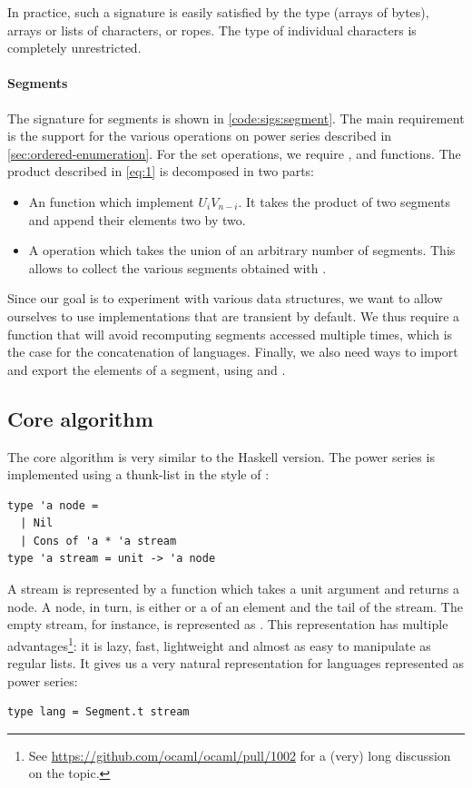 In practice, such a signature is easily satisfied by the \ocaml {}
type (\ie arrays of bytes), arrays or lists of characters, or ropes. The
type of individual characters is completely unrestricted.

\paragraph{Segments}

The signature for segments is shown in \autoref{code:sigs:segment}.
The main requirement is the support for the various operations on power series described in
\autoref{sec:ordered-enumeration}.
For the set operations, we require
,  and  functions.
%
The product described in \autoref{eq:1} is decomposed in two parts:
\begin{itemize}
\item  An  function which implement $U_i V_{n-i}$. It takes the
  product of two segments and append their elements two by two.
\item A  operation which takes the union of an arbitrary number
  of segments. This allows to collect the various segments obtained
  with .
\end{itemize}
%
Since our goal is to experiment with various data structures, we want to allow
ourselves to use implementations that are transient by default. We thus require
a  function that will avoid recomputing segments accessed multiple times, which is the case for the concatenation of languages.
%
Finally, we also need ways to import and export the elements of a segment, using  and .

\subsection{Core algorithm}

The core algorithm is very similar to the Haskell version. The power series
is implemented using a thunk-list in the style of \citet{DBLP:conf/cpp/Pottier17}:

\begin{lstlisting}
type 'a node =
  | Nil
  | Cons of 'a * 'a stream
type 'a stream = unit -> 'a node
\end{lstlisting}

A stream is represented by a function which takes a unit argument and returns
a node. A node, in turn, is either  or a  of an
element and the tail of the stream. The empty stream, for instance, is
represented as .
This representation has multiple advantages\footnote{See \url{https://github.com/ocaml/ocaml/pull/1002} for a (very) long discussion on the topic.}: it is lazy, fast, lightweight and almost as easy to manipulate as regular lists.
It gives us a very natural representation for languages represented as power series:
\begin{lstlisting}[numbers=none]
type lang = Segment.t stream
\end{lstlisting}

